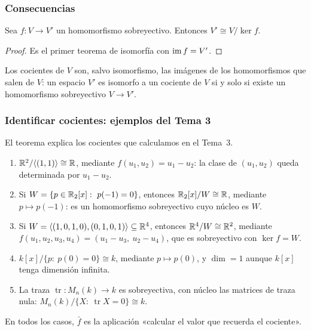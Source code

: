 
\begin{frame}
    \frametitle{Consecuencias}

    \begin{corollary}
        Sea $f\colon V\to V'$ un homomorfismo sobreyectivo. Entonces
        $V'\cong V/\ker f$.
    \end{corollary}

    \begin{proof}
        Es el primer teorema de isomorfía con $\operatorname{im} f=V'$.
    \end{proof}

    \medskip

    \alert{Los cocientes de $V$ son, salvo isomorfismo, las imágenes de
    los homomorfismos que salen de $V$}: un espacio $V'$ es isomorfo a un
    cociente de $V$ si y solo si existe un homomorfismo sobreyectivo
    $V\to V'$.
\end{frame}


\begin{frame}
    \frametitle{Identificar cocientes: ejemplos del Tema 3}

    El teorema explica los cocientes que calculamos en el Tema~3.

    \begin{example}
        \begin{enumerate}
            \item $\mathbb{R}^2/\langle(1,1)\rangle\cong\mathbb{R}$, mediante
            $f(u_1,u_2)=u_1-u_2$: la clase de $(u_1,u_2)$ queda
            determinada por $u_1-u_2$.
            \item Si $W=\{p\in\R_2[x]:\ p(-1)=0\}$, entonces
            $\mathbb{R}_2[x]/W\cong\mathbb{R}$, mediante $p\mapsto p(-1)$: es un
            homomorfismo sobreyectivo cuyo núcleo es $W$.
            \item Si $W=\langle(1,0,1,0),(0,1,0,1)\rangle\subseteq\mathbb{R}^4$,
            entonces $\mathbb{R}^4/W\cong\mathbb{R}^2$, mediante
            $f(u_1,u_2,u_3,u_4)=(u_1-u_3,\ u_2-u_4)$, que es sobreyectivo
            con $\ker f=W$.
            \item $k[x]/\{p:\ p(0)=0\}\cong k$, mediante $p\mapsto p(0)$,
            y $\dim=1$ aunque $k[x]$ tenga dimensión infinita.
            \item La traza $\operatorname{tr}\colon M_n(k)\to k$ es
            sobreyectiva, con núcleo las matrices de traza nula:
            $M_n(k)/\{X:\ \operatorname{tr}X=0\}\cong k$.
        \end{enumerate}
    \end{example}

    En todos los casos, $\bar f$ es la aplicación «calcular el valor
    que recuerda el cociente».
\end{frame}


